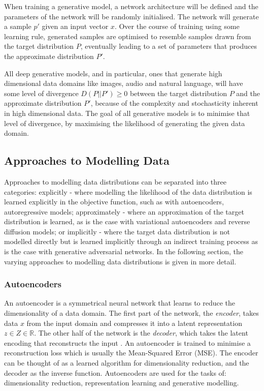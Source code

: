 When training a generative model, a network architecture will be defined and the parameters of the network will be randomly initialised.
The network will generate a sample $p'$ given an input vector $x$. 
Over the course of training using some learning rule, generated samples are optimised to resemble samples drawn from the target distribution $P$, eventually leading to a set of parameters that produces the approximate distribution $P'$.

All deep generative models, and in particular, ones that generate high dimensional data domains like images, audio and natural language, will have some level of divergence $D(P||P') \geq 0$ between the target distribution $P$ and the approximate distribution $P'$, because of the complexity and stochasticity inherent in high dimensional data. 
The goal of all generative models is to minimise that level of divergence, by maximising the likelihood of generating the given data domain.

\subsection{Approaches to Modelling Data}

Approaches to modelling data distributions can be separated into three categories: explicitly - where modelling the likelihood of the data distribution is learned explicitly in the objective function, such as with autoencoders, autoregressive models; approximately - where an approximation of the target distribution is learned, as is the case with variational autoencoders and reverse diffusion models; or implicitly - where the target data distribution is not modelled directly but is learned implicitly through an indirect training process as is the case with generative adversarial networks.
In the following section, the varying approaches to modelling data distributions is given in more detail. 

\subsubsection{Autoencoders}

An autoencoder is a symmetrical neural network that learns to reduce the dimensionality of a data domain.
The first part of the network, the \textit{encoder}, takes data $x$ from the input domain and compresses it into a latent representation $z \in Z \in \mathbb{R}$. 
The other half of the network is the \textit{decoder}, which takes the latent encoding that reconstructs the input \citep{kramer1991nonlinear}. 
An autoencoder is trained to minimise a reconstruction loss which is usually the Mean-Squared Error (MSE).
The encoder can be thought of as a learned algorithm for dimensionality reduction, and the decoder as the inverse function. 
Autoencoders are used for the tasks of: dimensionality reduction, representation learning and generative modelling.

